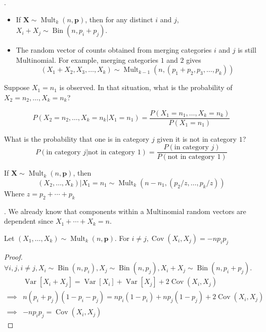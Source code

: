 \documentclass[8pt]{beamer}
\newcommand{\mb}[1]{\mathbf{#1}}
\newcommand{\Bin}[2]{\operatorname{Bin}\!\left(#1,#2\right)}
\newcommand{\Var}[1]{\operatorname{Var}\left[#1\right]}
\newcommand{\Cov}[2]{\operatorname{Cov}\!\left(#1, #2\right)}
\newcommand{\Mult}[3]{\operatorname{Mult}_{#1}\!\left(#2, #3\right)}
\begin{document}
\begin{frame}{.}
    \begin{theorem}
        \begin{itemize}
            \item If $\mb{X} \sim \Mult{k}{n}{\mb{p}}$, then for any distinct $i$ and $j$, $X_i + X_j \sim \Bin{n}{p_i + p_j}$.
            \item The random vector of counts obtained from merging categories $i$ and $j$ is still Multinomial. For example, merging categories $1$ and $2$ gives
            \[
                (X_1 +X_2, X_3, \dots, X_k) \sim \Mult{k-1}{n}{(p_1+ p_2, p_3, \dots, p_k)}
            \]
        \end{itemize}
    \end{theorem}

    Suppose $X_1 = n_1$ is observed. In that situation, what is the probability of $X_2 =n_2, \dots, X_k = n_k$?

    \[
        P(X_2 = n_2, \dots, X_k = n_k| X_1 = n_1) = \frac{P(X_1=n_1, \dots, X_k=n_k)}{P(X_1 = n_1)}
    \]

    What is the probability that one is in category $j$ given it is not in category $1$?
    \[
    P(\text{in category }j|\text{not in category }1) = \frac{P(\text{in category }j)}{P(\text{not in category }1)}
    \]
    \begin{theorem}
        If $\mb{X} \sim \Mult{k}{n}{\mb{p}}$, then 
        \[
            (X_2, \dots, X_k)|X_1 =n_1 \sim \Mult{k}{n-n_1}{(p_2/z, \dots, p_k/z)}
        \]
        Where $z = p_2 + \cdots + p_k$
    \end{theorem}
\end{frame}

\begin{frame}{.}
    We already know that components within a Multinomial random vectors are dependent since $X_1 + \cdots + X_k = n$.
    \begin{theorem}
        Let $(X_1, \dots, X_k) \sim \Mult{k}{n}{\mb{p}}$. For $i\neq j, \Cov{X_i}{X_j} = -n p_i p_j$ 
    \end{theorem}
    \begin{proof}
        $\forall i, j, i \neq j, X_i \sim \Bin{n}{p_i},X_j \sim \Bin{n}{p_j}, X_i +X_j \sim \Bin{n}{p_i + p_j}$. 
        \[
        \begin{aligned}
            &\Var{X_i + X_j} = \Var{X_i} + \Var{X_j} + 2\Cov{X_i}{X_j} \\
            \implies& n (p_i + p_j) (1 - p_i - p_j) = n p_i (1- p_i) + n p_j (1- p_j) + 2\Cov{X_i}{X_j} \\
            \implies&   -np_i p_j = \Cov{X_i}{X_j}
        \end{aligned}
        \]
    \end{proof}
\end{frame}
\end{document}
